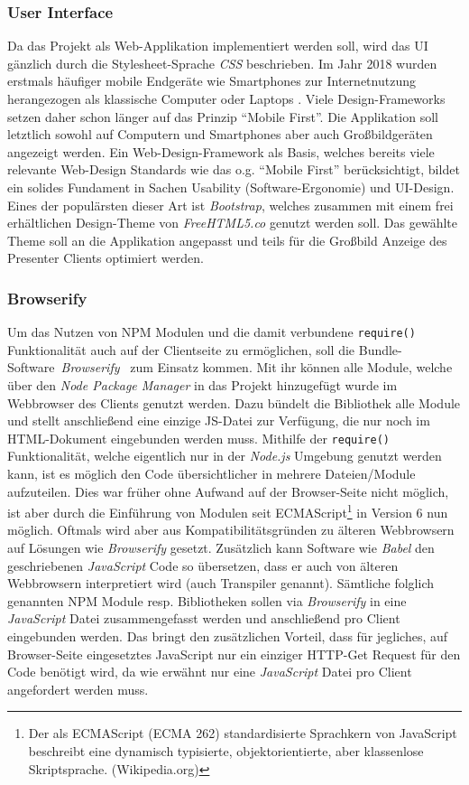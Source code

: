 \subsubsection{User Interface}\label{sec:uientwurf}
Da das Projekt als Web-Applikation implementiert werden soll, wird das UI gänzlich durch die Stylesheet-Sprache \emph{CSS} beschrieben. Im Jahr 2018 wurden erstmals häufiger mobile Endgeräte wie Smartphones zur Internetnutzung herangezogen als klassische Computer oder Laptops \cite{Rabe2019}. Viele Design-Frameworks setzen daher schon länger auf das Prinzip "`Mobile First"'. Die Applikation soll letztlich sowohl auf Computern und Smartphones aber auch Großbildgeräten angezeigt werden. Ein Web-Design-Framework als Basis, welches bereits viele relevante Web-Design Standards wie das o.g. "`Mobile First"' berücksichtigt, bildet ein solides Fundament in Sachen Usability (Software-Ergonomie) und UI-Design. Eines der populärsten dieser Art ist \emph{Bootstrap}, welches zusammen mit einem frei erhältlichen Design-Theme von \emph{FreeHTML5.co} \cite{FreeHTML5.co2019} genutzt werden soll. Das gewählte Theme soll an die Applikation angepasst und teils für die Großbild Anzeige des Presenter Clients optimiert werden.  
\subsubsection{Browserify}\label{sec:browserify}
Um das Nutzen von NPM Modulen und die damit verbundene \texttt{require()} Funktionalität auch auf der Clientseite zu ermöglichen, soll die Bundle-Soft\-ware~\emph{Brow\-serify}~\cite{Browserify2019} zum Einsatz kommen. Mit ihr können alle Module, welche über den \emph{Node Package Manager} in das Projekt hinzugefügt wurde im Webbrowser des Clients genutzt werden. Dazu bündelt die Bibliothek alle Module und stellt anschließend eine einzige JS-Datei zur Verfügung, die nur noch im HTML-Dokument eingebunden werden muss. Mithilfe der \texttt{require()} Funktionalität, welche eigentlich nur in der \emph{Node.js} Umgebung genutzt werden kann, ist es möglich den Code übersichtlicher in mehrere Dateien/Module aufzuteilen. Dies war früher ohne Aufwand auf der Browser-Seite nicht möglich, ist aber durch die Einführung von Modulen seit ECMAScript\footnote{Der als ECMAScript (ECMA 262) standardisierte Sprachkern von JavaScript beschreibt eine dynamisch typisierte, objektorientierte, aber klassenlose Skriptsprache. (Wikipedia.org)} in Version 6 nun möglich. Oftmals wird aber aus Kompatibilitätsgründen zu älteren Webbrowsern auf Lösungen wie \emph{Browserify} gesetzt. Zusätzlich kann Software wie \emph{Babel} den geschriebenen \emph{JavaScript} Code so übersetzen, dass er auch von älteren Webbrowsern interpretiert wird (auch Transpiler genannt). Sämtliche folglich genannten NPM Module resp. Bibliotheken sollen via \emph{Browserify} in eine \emph{JavaScript} Datei zusammengefasst werden und anschließend pro Client eingebunden werden. Das bringt den zusätzlichen Vorteil, dass für jegliches, auf Browser-Seite eingesetztes JavaScript nur ein einziger HTTP-Get Request für den Code benötigt wird, da wie erwähnt nur eine \emph{JavaScript} Datei pro Client angefordert werden muss. 
